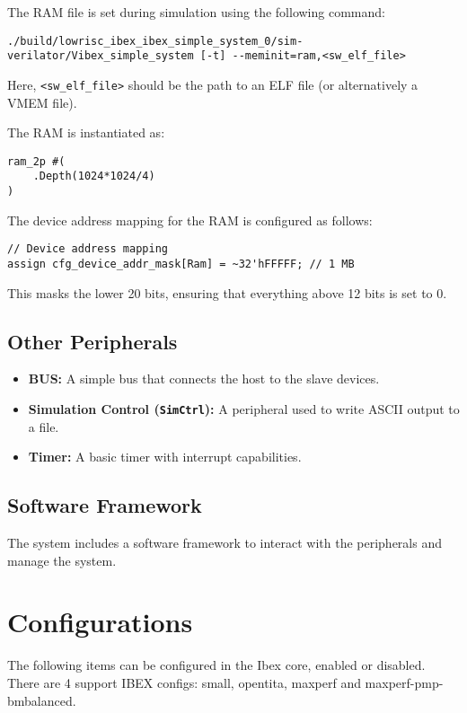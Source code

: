 \documentclass{article}
\begin{document}
The RAM file is set during simulation using the following command:
\begin{verbatim}
./build/lowrisc_ibex_ibex_simple_system_0/sim-verilator/Vibex_simple_system [-t] --meminit=ram,<sw_elf_file>
\end{verbatim}
Here, \texttt{<sw\_elf\_file>} should be the path to an ELF file (or alternatively a VMEM file).

The RAM is instantiated as:
\begin{verbatim}
ram_2p #(
    .Depth(1024*1024/4)
)
\end{verbatim}

The device address mapping for the RAM is configured as follows:
\begin{verbatim}
// Device address mapping
assign cfg_device_addr_mask[Ram] = ~32'hFFFFF; // 1 MB
\end{verbatim}
This masks the lower 20 bits, ensuring that everything above 12 bits is set to 0.

\subsection{Other Peripherals}
\begin{itemize}
    \item \textbf{BUS:} A simple bus that connects the host to the slave devices.
    \item \textbf{Simulation Control (\texttt{SimCtrl}):} A peripheral used to write ASCII output to a file.
    \item \textbf{Timer:} A basic timer with interrupt capabilities.
\end{itemize}

\subsection{Software Framework}
The system includes a software framework to interact with the peripherals and manage the system.

\section{Configurations}


The following items can be configured in the Ibex core, enabled or disabled. 
There are 4 support IBEX configs: small, opentita, maxperf and maxperf-pmp-bmbalanced.
\end{document}
